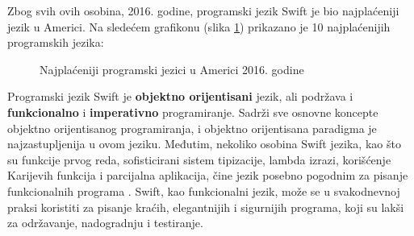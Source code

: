 \documentclass[a4paper]{article}
\begin{document}
Zbog svih ovih osobina, 2016. godine, programski jezik Swift je bio najplaćeniji jezik u Americi. Na sledećem grafikonu (slika \ref{fig:grafikon}) prikazano je 10 najplaćenijih programskih jezika:

\begin{figure}[hbt!]
\hspace{2.5em}
\caption{Najplaćeniji programski jezici u Americi 2016. godine}
\label{fig:grafikon}
\end{figure}


Programski jezik Swift je \textbf{objektno orijentisani} jezik, ali podržava i \textbf{funkcionalno} i \textbf{imperativno}
programiranje. Sadrži sve osnovne koncepte objektno orijentisanog programiranja, i objektno orijentisana paradigma je najzastupljenija u ovom jeziku. Međutim, nekoliko osobina Swift jezika, kao što su funkcije prvog reda, sofisticirani sistem tipizacije, lambda izrazi, korišćenje Karijevih funkcija i parcijalna aplikacija, čine jezik posebno pogodnim za pisanje funkcionalnih programa \cite{rad}. Swift, kao funkcionalni jezik, može se u svakodnevnoj praksi koristiti za pisanje kraćih, elegantnijih i sigurnijih programa, koji su lakši za održavanje, nadogradnju i testiranje.
\end{document}
